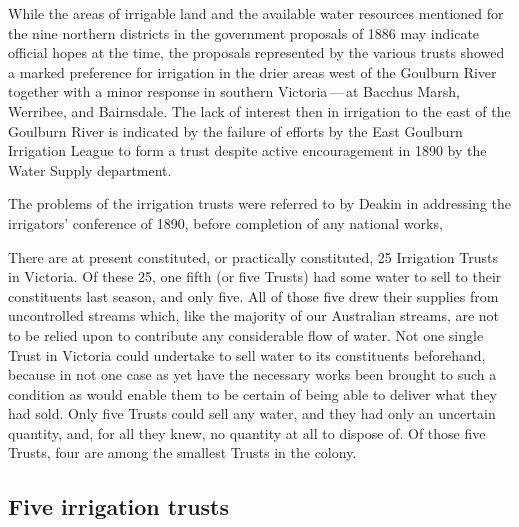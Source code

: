 While the areas of irrigable land and the available water resources
mentioned for the nine northern districts in the government proposals
of 1886 may indicate official hopes at the time, the proposals
represented by the various trusts showed a marked preference for
irrigation in the drier areas west of the Goulburn River together with
a minor response in southern Victoria\,---\,at Bacchus Marsh,
  Werribee,  and
Bairnsdale.   The lack of interest then in
irrigation to the east of the Goulburn River is indicated by the
failure of efforts by the East Goulburn Irrigation League to form a
trust despite active encouragement in 1890 by the Water Supply
department.

The problems of the irrigation trusts were referred to by Deakin
 in
addressing the irrigators' conference of 1890, before completion of
any national works,
\begin{Quote}
	There are at present constituted, or practically constituted,
	25 Irrigation Trusts in Victoria.  Of these 25, one fifth (or
	five Trusts) had some water to sell to their constituents last
	season, and only five.  All of those five drew their supplies
	from uncontrolled streams which, like the majority of our
	Australian streams, are not to be relied upon to contribute
	any considerable flow of water. Not one single Trust in
	Victoria could undertake to sell water to its constituents
	beforehand, because in not one case as yet have the necessary
	works been brought to such a condition as would enable them to
	be certain of being able to deliver what they had sold. Only
	five Trusts could sell any water, and they had only an
	uncertain quantity, and, for all they knew, no quantity at all
	to dispose of.  Of those five Trusts, four are among the
	smallest Trusts in the colony.
\end{Quote}

\subsection*{Five irrigation trusts}

